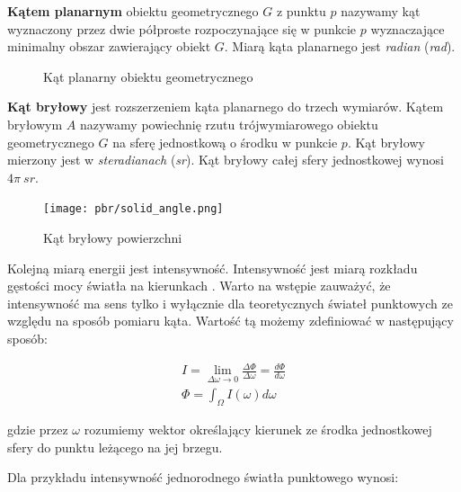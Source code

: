 \documentclass[../main.tex]{subfiles}
\begin{document}
\textbf{Kątem planarnym} obiektu geometrycznego $G$ z punktu $p$ nazywamy kąt
wyznaczony przez dwie półproste rozpoczynające się w punkcie $p$ wyznaczające
minimalny obszar zawierający obiekt $G$. Miarą kąta planarnego jest
\textit{radian} (\textit{rad}).

\begin{figure}[ht]
  \centering
  \caption{Kąt planarny obiektu geometrycznego}
  \label{fig:PlanarAngle}
\end{figure}

\textbf{Kąt bryłowy} jest rozszerzeniem kąta planarnego do trzech wymiarów.
Kątem bryłowym $A$ nazywamy powiechnię rzutu trójwymiarowego obiektu
geometrycznego $G$ na sferę jednostkową o środku w punkcie $p$. Kąt bryłowy
mierzony jest w \textit{steradianach} (\textit{sr}). Kąt bryłowy całej sfery
jednostkowej wynosi $4\pi \:{sr}$.

\begin{figure}[ht]
  \centering
  \texttt{[image: pbr/solid\_angle.png]}
  \caption{Kąt bryłowy powierzchni}
  \label{fig:SolidAngle}
\end{figure}

Kolejną miarą energii jest intensywność. Intensywność jest miarą
rozkładu gęstości mocy światła na kierunkach \cite[p. 328]{pbrt}. Warto na
wstępie zauważyć, że intensywność ma sens tylko i wyłącznie dla teoretycznych
świateł punktowych ze względu na sposób pomiaru kąta. Wartość tą możemy
zdefiniować w następujący sposób:

\begin{gather*}
  I = \lim_{\Delta\omega \rightarrow 0} {
    \frac{\Delta\Phi}{\Delta\omega}
  } = \frac{d\Phi}{d\omega} \\
  \Phi = \int_{\Omega} {I(\omega) d\omega}
\end{gather*}

\noindent gdzie przez $\omega$ rozumiemy wektor określający kierunek ze środka
jednostkowej sfery do punktu leżącego na jej brzegu.

Dla przykładu intensywność jednorodnego światła punktowego wynosi:
\end{document}

